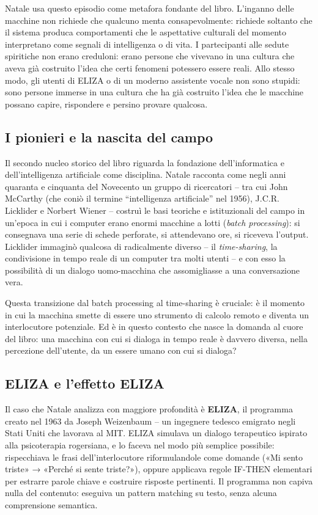 \documentclass[a4paper,11pt]{article}
\begin{document}
Natale usa questo episodio come metafora fondante del libro. L'inganno delle macchine non richiede che qualcuno menta consapevolmente: richiede soltanto che il sistema produca comportamenti che le aspettative culturali del momento interpretano come segnali di intelligenza o di vita. I partecipanti alle sedute spiritiche non erano creduloni: erano persone che vivevano in una cultura che aveva già costruito l'idea che certi fenomeni potessero essere reali. Allo stesso modo, gli utenti di ELIZA o di un moderno assistente vocale non sono stupidi: sono persone immerse in una cultura che ha già costruito l'idea che le macchine possano capire, rispondere e persino provare qualcosa.

\subsection{I pionieri e la nascita del campo}

Il secondo nucleo storico del libro riguarda la fondazione dell'informatica e dell'intelligenza artificiale come disciplina. Natale racconta come negli anni quaranta e cinquanta del Novecento un gruppo di ricercatori -- tra cui John McCarthy (che coniò il termine ``intelligenza artificiale'' nel 1956), J.C.R. Licklider e Norbert Wiener -- costruì le basi teoriche e istituzionali del campo in un'epoca in cui i computer erano enormi macchine a lotti (\emph{batch processing}): si consegnava una serie di schede perforate, si attendevano ore, si riceveva l'output. Licklider immaginò qualcosa di radicalmente diverso -- il \emph{time-sharing}, la condivisione in tempo reale di un computer tra molti utenti -- e con esso la possibilità di un dialogo uomo-macchina che assomigliasse a una conversazione vera.

Questa transizione dal batch processing al time-sharing è cruciale: è il momento in cui la macchina smette di essere uno strumento di calcolo remoto e diventa un interlocutore potenziale. Ed è in questo contesto che nasce la domanda al cuore del libro: una macchina con cui si dialoga in tempo reale è davvero diversa, nella percezione dell'utente, da un essere umano con cui si dialoga?

\subsection{ELIZA e l'effetto ELIZA}

Il caso che Natale analizza con maggiore profondità è \textbf{ELIZA}, il programma creato nel 1963 da Joseph Weizenbaum -- un ingegnere tedesco emigrato negli Stati Uniti che lavorava al MIT. ELIZA simulava un dialogo terapeutico ispirato alla psicoterapia rogersiana, e lo faceva nel modo più semplice possibile: rispecchiava le frasi dell'interlocutore riformulandole come domande («Mi sento triste» → «Perché si sente triste?»), oppure applicava regole IF-THEN elementari per estrarre parole chiave e costruire risposte pertinenti. Il programma non capiva nulla del contenuto: eseguiva un pattern matching su testo, senza alcuna comprensione semantica.
\end{document}
